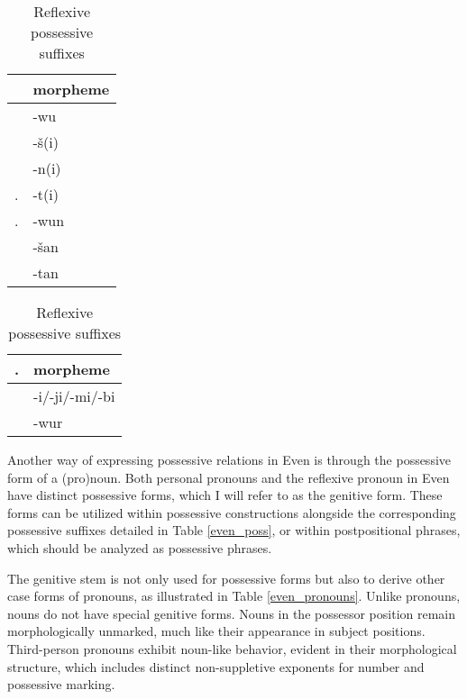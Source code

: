 \begin{table}[ht]
	\caption{Possessive markers in Even}\label{even_poss}
	\begin{subtable}[t]{0.48\textwidth}
		\centering
		\caption{\centering Personal possessive suffixes}
		\label{perposs}
		\begin{tabular}[t]{ll}\addlinespace\toprule
			\Poss    & morpheme  \\\midrule
			\Fsg     & -wu   \\
			\Ssg     & -š(i)     \\
			\Tsg     & -n(i)       \\
			\Fpl.\Incl & -t(i)     \\
			\Fpl.\Excl & -wun \\
			\Spl     & -šan      \\
			\Tpl     & -tan      \\\bottomrule
		\end{tabular}
	\end{subtable}
	\hfill
	\begin{subtable}[t]{0.48\textwidth}
		\centering
		\caption{\centering Reflexive possessive suffixes}
		\label{reflposs}
		\begin{tabular}{cl}\addlinespace\toprule
			\Poss.\Refl & morpheme\\\midrule
			\Sg & -i/-ji/-mi/-bi \\
			\Pl & -wur\\\bottomrule
		\end{tabular}
	\end{subtable}
\end{table}

Another way of expressing possessive relations in Even is through the possessive form of a (pro)noun. Both personal pronouns and the reflexive pronoun in Even have distinct possessive forms, which I will refer to as the genitive form. These forms can be utilized within possessive constructions alongside the corresponding possessive suffixes detailed in Table \ref{even_poss}, or within postpositional phrases, which should be analyzed as possessive phrases.

The genitive stem is not only used for possessive forms but also to derive other case forms of pronouns, as illustrated in Table \ref{even_pronouns}. Unlike pronouns, nouns do not have special genitive forms. Nouns in the possessor position remain morphologically unmarked, much like their appearance in subject positions. Third-person pronouns exhibit noun-like behavior, evident in their morphological structure, which includes distinct non-suppletive exponents for number and possessive marking.

